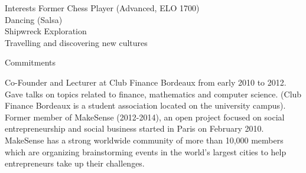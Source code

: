\documentclass{resume} %
\begin{document}
\begin{rSection}{Interests}
Former Chess Player (Advanced, ELO 1700) \\ 
Dancing (Salsa) \\
Shipwreck Exploration \\
Travelling and discovering new cultures
\end{rSection}

\begin{rSection}{Commitments}

Co-Founder and Lecturer at Club Finance Bordeaux from early 2010 to 2012. Gave talks on topics related to finance, mathematics and computer science. (Club Finance Bordeaux is a student association located on the university campus). \\

Former member of MakeSense (2012-2014), an open project focused on social entrepreneurship and social business started in Paris on February 2010. MakeSense has a strong worldwide community of more than 10,000 members which are organizing brainstorming events in the world’s largest cities to help entrepreneurs take up their challenges.

\end{rSection}





\end{document}
